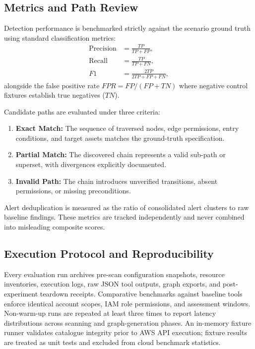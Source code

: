 \documentclass[conference]{IEEEtran}
\begin{document}
\subsection{Metrics and Path Review}
Detection performance is benchmarked strictly against the scenario ground truth using standard classification metrics:
\begin{equation}
\begin{aligned}
\mathrm{Precision}&=\frac{TP}{TP+FP},\\
\mathrm{Recall}&=\frac{TP}{TP+FN},\\
F1&=\frac{2TP}{2TP+FP+FN},
\end{aligned}
\label{eq:metrics}
\end{equation}
alongside the false positive rate $FPR = FP / (FP + TN)$ where negative control fixtures establish true negatives ($TN$).

Candidate paths are evaluated under three criteria:
\begin{enumerate}
\item \textbf{Exact Match:} The sequence of traversed nodes, edge permissions, entry conditions, and target assets matches the ground-truth specification.
\item \textbf{Partial Match:} The discovered chain represents a valid sub-path or superset, with divergences explicitly documented.
\item \textbf{Invalid Path:} The chain introduces unverified transitions, absent permissions, or missing preconditions.
\end{enumerate}
Alert deduplication is measured as the ratio of consolidated alert clusters to raw baseline findings. These metrics are tracked independently and never combined into misleading composite scores.

\subsection{Execution Protocol and Reproducibility}
Every evaluation run archives pre-scan configuration snapshots, resource inventories, execution logs, raw JSON tool outputs, graph exports, and post-experiment teardown receipts. Comparative benchmarks against baseline tools enforce identical account scopes, IAM role permissions, and assessment windows. Non-warm-up runs are repeated at least three times to report latency distributions across scanning and graph-generation phases. An in-memory fixture runner validates catalogue integrity prior to AWS API execution; fixture results are treated as unit tests and excluded from cloud benchmark statistics.
\end{document}
